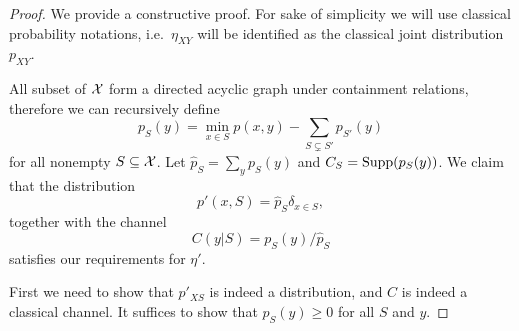 \begin{proof}
    We provide a constructive proof. For sake of simplicity we will use classical probability notations, i.e.\ $\eta_{XY}$ will be identified as the classical joint distribution $p_{XY}$.

    All subset of $\mathcal{X}$ form a directed acyclic graph under containment relations, therefore we can recursively define 
    $$p_S(y)=\min_{x\in S}p(x,y)-\sum_{S\subsetneq S'}p_{S'}(y)$$
    for all nonempty $S\subseteq\mathcal{X}$. Let $\hat{p}_S=\sum_yp_S(y)$ and $C_S=\mathrm{Supp}(p_S(y))$. We claim that the distribution 
    $$p'(x,S)=\hat{p}_S\delta_{x\in S},$$
    together with the channel
    $$C(y|S)=p_S(y)/\hat{p}_S$$
    satisfies our requirements for $\eta'$. 

    First we need to show that $p'_{XS}$ is indeed a distribution, and $C$ is indeed a classical channel. It suffices to show that $p_S(y)\geq0$ for all $S$ and $y$. 
    

\end{proof}
